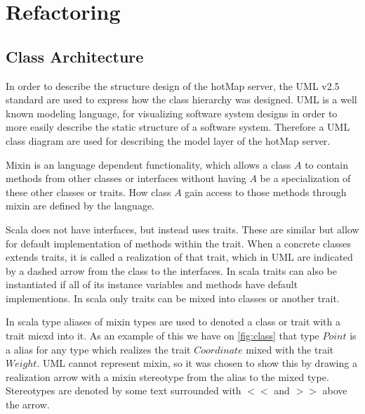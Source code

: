 \section{Refactoring} \label{sec:s4_refactoring}



\subsection{Class Architecture}
In order to describe the structure design of the hotMap server, the UML v2.5 standard are used to express how the class hierarchy was designed. UML is a well known modeling language, for visualizing software system designs in order to more easily describe the static structure of a software system.
Therefore a UML class diagram are used for describing the model layer of the hotMap server.

Mixin is an language dependent functionality, which allows a class $A$ to contain methods from other classes or interfaces without having $A$ be a specialization of these other classes or traits. How class $A$ gain access to those methods through mixin are defined by the language. 

Scala does not have interfaces, but instead uses traits. These are similar but allow for default implementation of methods within the trait. When a concrete classes extends traits, it is called a realization of that trait, which in UML are indicated by a dashed arrow from the class to the interfaces. In scala traits can also be instantiated if all of its instance variables and methods have default implementions. In scala only traits can be mixed into classes or another trait.


In scala type aliases of mixin types are used to denoted a class or trait with a trait miexd into it. As an example of this we have on \cref{fig:class} that type $Point$ is a alias for any type which realizes the trait $Coordinate$ mixed with the trait $Weight$. UML cannot represent mixin, so it was chosen to show this by drawing a realization arrow with a mixin stereotype from the alias to the mixed type. Stereotypes are denoted by some text surrounded with $<<$ and $>>$ above the arrow.

